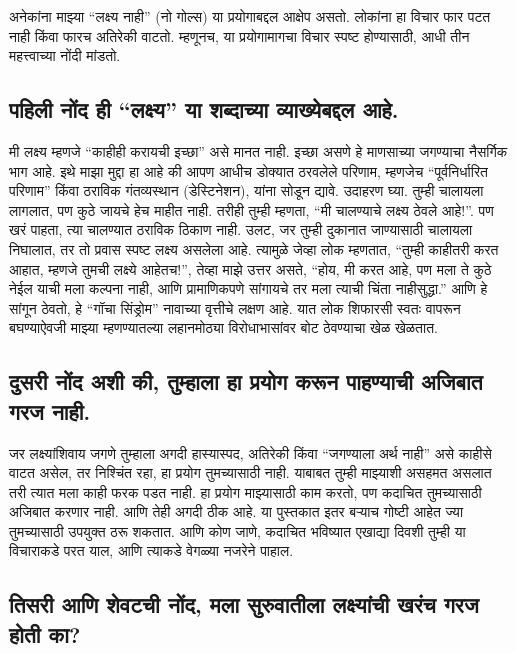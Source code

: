 अनेकांना माझ्या ``लक्ष्य नाही'' (नो गोल्स) या प्रयोगाबद्दल आक्षेप असतो. लोकांना हा विचार फार पटत नाही किंवा फारच अतिरेकी वाटतो. म्हणूनच, या प्रयोगामागचा विचार स्पष्ट होण्यासाठी, आधी तीन महत्त्वाच्या नोंदी मांडतो.

\subsection*{पहिली नोंद ही ``लक्ष्य'' या शब्दाच्या व्याख्येबद्दल आहे.}  

मी लक्ष्य म्हणजे ``काहीही करायची इच्छा'' असे मानत नाही. इच्छा असणे हे माणसाच्या जगण्याचा नैसर्गिक भाग आहे. इथे माझा मुद्दा हा आहे की आपण आधीच डोक्यात ठरवलेले परिणाम, म्हणजेच ``पूर्वनिर्धारित परिणाम'' किंवा ठराविक गंतव्यस्थान (डेस्टिनेशन), यांना सोडून द्यावे. उदाहरण घ्या. तुम्ही चालायला लागलात, पण कुठे जायचे हेच माहीत नाही. तरीही तुम्ही म्हणता, ``मी चालण्याचे लक्ष्य ठेवले आहे!''. पण खरं पाहता, त्या चालण्यात ठराविक ठिकाण नाही. उलट, जर तुम्ही दुकानात जाण्यासाठी चालायला निघालात, तर तो प्रवास स्पष्ट लक्ष्य असलेला आहे. त्यामुळे जेव्हा लोक म्हणतात, ``तुम्ही काहीतरी करत आहात, म्हणजे तुमची लक्ष्ये आहेतच!'', तेव्हा माझे उत्तर असते, ``होय, मी करत आहे, पण मला ते कुठे नेईल याची मला कल्पना नाही, आणि प्रामाणिकपणे सांगायचे तर मला त्याची चिंता नाहीसुद्धा.'' आणि हे सांगून ठेवतो,  हे ``गॉचा सिंड्रोम''  नावाच्या वृत्तीचे लक्षण आहे. यात लोक शिफारसी स्वतः वापरून बघण्याऐवजी माझ्या म्हणण्यातल्या लहानमोठ्या विरोधाभासांवर बोट ठेवण्याचा खेळ खेळतात.

\subsection*{दुसरी नोंद अशी की, तुम्हाला हा प्रयोग करून पाहण्याची अजिबात गरज नाही.}

जर लक्ष्यांशिवाय जगणे तुम्हाला अगदी हास्यास्पद, अतिरेकी किंवा ``जगण्याला अर्थ नाही'' असे काहीसे वाटत असेल, तर निश्चिंत रहा,  हा प्रयोग तुमच्यासाठी नाही. याबाबत तुम्ही माझ्याशी असहमत असलात तरी त्यात मला काही फरक पडत नाही. हा प्रयोग माझ्यासाठी काम करतो, पण कदाचित तुमच्यासाठी अजिबात करणार नाही. आणि तेही अगदी ठीक आहे. या पुस्तकात इतर बर्‍याच गोष्टी आहेत ज्या तुमच्यासाठी उपयुक्त ठरू शकतात. आणि कोण जाणे, कदाचित भविष्यात एखाद्या दिवशी तुम्ही या विचाराकडे परत याल, आणि त्याकडे वेगळ्या नजरेने पाहाल.

\subsection*{तिसरी आणि शेवटची नोंद, मला सुरुवातीला लक्ष्यांची खरंच गरज होती का?}


